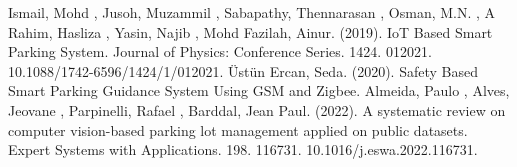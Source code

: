 \documentclass[conference]{IEEEtran}
\begin{document}
	
	
	

	
\begin{thebibliography}{00}
Ismail, Mohd , Jusoh, Muzammil , Sabapathy, Thennarasan , Osman, M.N. , A Rahim, Hasliza , Yasin, Najib , Mohd Fazilah, Ainur. (2019). IoT Based Smart Parking System. Journal of Physics: Conference Series. 1424. 012021. 10.1088/1742-6596/1424/1/012021. 
 Üstün Ercan, Seda. (2020). Safety Based Smart Parking Guidance System Using GSM and Zigbee. 
 Almeida, Paulo , Alves, Jeovane , Parpinelli, Rafael , Barddal, Jean Paul. (2022). A systematic review on computer vision-based parking lot management applied on public datasets. Expert Systems with Applications. 198. 116731. 10.1016/j.eswa.2022.116731.
\end{thebibliography}
\end{document}
